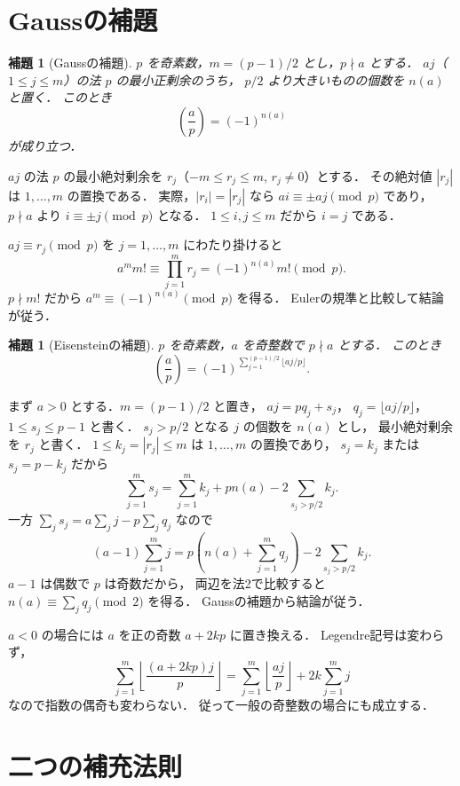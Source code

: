 \documentclass[a5paper,10pt,onecolumn]{jsarticle}
\makeatletter
\theoremstyle{mathnotetheorem}
\newtheorem{lemma}[theorem]{補題}
\renewcommand{\proofname}{証明}
\renewenvironment{proof}[1][\proofname]{%
  \par\pushQED{\qed}\normalfont\topsep4\p@\@plus2\p@\relax
  \trivlist\item[\hskip\labelsep\bfseries #1]\ignorespaces
}{\popQED\endtrivlist\@endpefalse}
\makeatother
\begin{document}
\section{Gaussの補題}

\begin{lemma}[Gaussの補題]\label{lem:gauss}
$p$ を奇素数，$m=(p-1)/2$ とし，$p\nmid a$ とする．
$aj$（$1\le j\le m$）の法 $p$ の最小正剰余のうち，
$p/2$ より大きいものの個数を $n(a)$ と置く．
このとき
\[
 \left(\frac ap\right)=(-1)^{n(a)}
\]
が成り立つ．
\end{lemma}
\begin{proof}
$aj$ の法 $p$ の最小絶対剰余を
$r_j$（$-m\le r_j\le m$, $r_j\ne0$）とする．
その絶対値 $|r_j|$ は $1,\dots,m$ の置換である．
実際，$|r_i|=|r_j|$ なら
$ai\equiv\pm aj\pmod p$ であり，
$p\nmid a$ より $i\equiv\pm j\pmod p$ となる．
$1\le i,j\le m$ だから $i=j$ である．

$aj\equiv r_j\pmod p$ を $j=1,\dots,m$ にわたり掛けると
\[
 a^m m!\equiv\prod_{j=1}^m r_j
 =(-1)^{n(a)}m!\pmod p.
\]
$p\nmid m!$ だから
$a^m\equiv(-1)^{n(a)}\pmod p$ を得る．
Eulerの規準と比較して結論が従う．
\end{proof}

\begin{lemma}[Eisensteinの補題]\label{lem:eisenstein}
$p$ を奇素数，$a$ を奇整数で $p\nmid a$ とする．
このとき
\[
 \left(\frac ap\right)
 =(-1)^{\sum_{j=1}^{(p-1)/2}\lfloor aj/p\rfloor}.
\]
\end{lemma}
\begin{proof}
まず $a>0$ とする．$m=(p-1)/2$ と置き，
$aj=pq_j+s_j$，
$q_j=\lfloor aj/p\rfloor$，
$1\le s_j\le p-1$ と書く．
$s_j>p/2$ となる $j$ の個数を $n(a)$ とし，
最小絶対剰余を $r_j$ と書く．
$1\le k_j=|r_j|\le m$ は $1,\dots,m$ の置換であり，
$s_j=k_j$ または $s_j=p-k_j$ だから
\[
 \sum_{j=1}^m s_j
 =\sum_{j=1}^mk_j
  +pn(a)-2\sum_{s_j>p/2}k_j.
\]
一方 $\sum_js_j=a\sum_jj-p\sum_jq_j$ なので
\[
 (a-1)\sum_{j=1}^m j
 =p\left(n(a)+\sum_{j=1}^m q_j\right)
  -2\sum_{s_j>p/2}k_j.
\]
$a-1$ は偶数で $p$ は奇数だから，
両辺を法2で比較すると
$n(a)\equiv\sum_jq_j\pmod2$ を得る．
Gaussの補題から結論が従う．

$a<0$ の場合には $a$ を正の奇数 $a+2kp$ に置き換える．
Legendre記号は変わらず，
\[
 \sum_{j=1}^m\left\lfloor\frac{(a+2kp)j}{p}\right\rfloor
 =\sum_{j=1}^m\left\lfloor\frac{aj}{p}\right\rfloor
  +2k\sum_{j=1}^m j
\]
なので指数の偶奇も変わらない．
従って一般の奇整数の場合にも成立する．
\end{proof}

\section{二つの補充法則}
\end{document}

